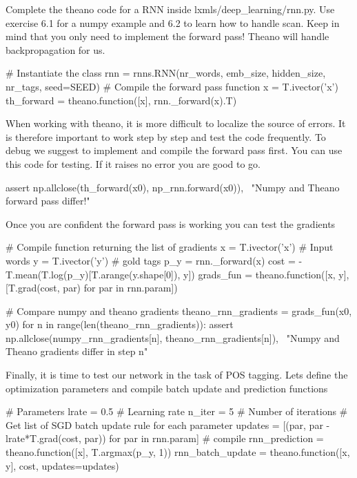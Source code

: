 \begin{exercise}
Complete the theano code for a RNN inside lxmls/deep\_learning/rnn.py. Use
exercise 6.1 for a numpy example and 6.2 to learn how to handle scan. Keep in
mind that you only need to implement the forward pass! Theano will handle
backpropagation for us. 
\begin{python}
# Instantiate the class
rnn = rnns.RNN(nr_words, emb_size, hidden_size, nr_tags, seed=SEED)
# Compile the forward pass function
x = T.ivector('x')
th_forward = theano.function([x], rnn._forward(x).T)
\end{python}
When working with theano, it is more difficult to localize the source of
errors. It is therefore important to work step by step and test the
code frequently. To debug we suggest to implement and compile the forward pass
first. You can use this code for testing. If it raises no error you are good to
go.
\begin{python}
assert np.allclose(th_forward(x0), np_rnn.forward(x0)), \
    "Numpy and Theano forward pass differ!"
\end{python}
Once you are confident the forward pass is working you can test the gradients
\begin{python}
# Compile function returning the list of gradients
x = T.ivector('x')     # Input words
y = T.ivector('y')     # gold tags 
p_y = rnn._forward(x)
cost = -T.mean(T.log(p_y)[T.arange(y.shape[0]), y])
grads_fun = theano.function([x, y], [T.grad(cost, par) for par in rnn.param])
\end{python}

\begin{python}
# Compare numpy and theano gradients
theano_rnn_gradients = grads_fun(x0, y0)
for n in range(len(theano_rnn_gradients)): 
    assert np.allclose(numpy_rnn_gradients[n], theano_rnn_gradients[n]), \
        "Numpy and Theano gradients differ in step n"
\end{python}

\noindent Finally, it is time to test our network in the task of POS tagging. Lets define
the optimization parameters and compile batch update and prediction
functions

\begin{python}
# Parameters
lrate = 0.5   # Learning rate
n_iter = 5    # Number of iterations
# Get list of SGD batch update rule for each parameter
updates = [(par, par - lrate*T.grad(cost, par)) for par in rnn.param]
# compile
rnn_prediction = theano.function([x], T.argmax(p_y, 1))
rnn_batch_update = theano.function([x, y], cost, updates=updates)
\end{python}


\end{exercise}
